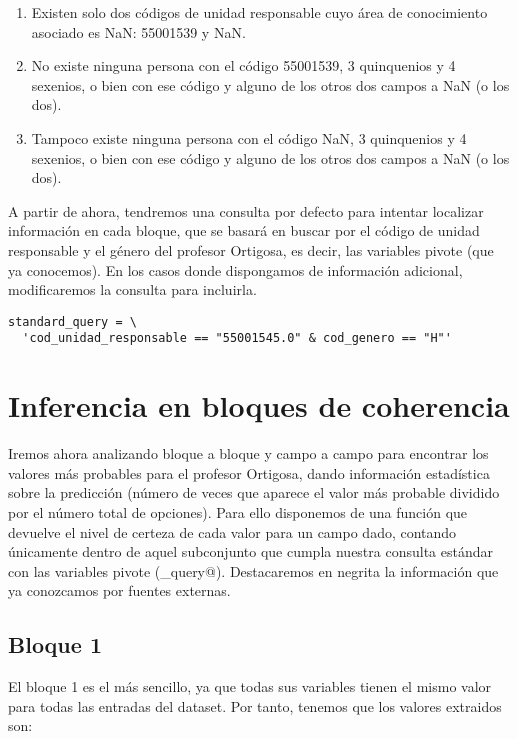 \documentclass[11pt]{article}
\begin{document}
\begin{enumerate}
  \item Existen solo dos códigos de unidad responsable cuyo área de conocimiento asociado es NaN: 55001539 y NaN.
  \item No existe ninguna persona con el código 55001539, 3 quinquenios y 4 sexenios, o bien con ese código y alguno de los otros dos campos a NaN (o los dos).
  \item Tampoco existe ninguna persona con el código NaN, 3 quinquenios y 4 sexenios, o bien con ese código y alguno de los otros dos campos a NaN (o los dos).
\end{enumerate}

A partir de ahora, tendremos una consulta por defecto para intentar localizar información en cada bloque, que se basará en buscar por el código de unidad responsable y el género del profesor Ortigosa, es decir, las variables pivote (que ya conocemos). En los casos donde dispongamos de información adicional, modificaremos la consulta para incluirla.

\begin{verbatim}
standard_query = \
  'cod_unidad_responsable == "55001545.0" & cod_genero == "H"'
\end{verbatim}

\section{Inferencia en bloques de coherencia}

Iremos ahora analizando bloque a bloque y campo a campo para encontrar los valores más probables para el profesor Ortigosa, dando información estadística sobre la predicción (número de veces que aparece el valor más probable dividido por el número total de opciones). Para ello disponemos de una función \verb@freq@ que devuelve el nivel de certeza de cada valor para un campo dado, contando únicamente dentro de aquel subconjunto que cumpla nuestra consulta estándar con las variables pivote (\verb@standard_query@). Destacaremos en negrita la información que ya conozcamos por fuentes externas.

\subsection{Bloque 1}
El bloque 1 es el más sencillo, ya que todas sus variables tienen el mismo valor para todas las entradas del dataset. Por tanto, tenemos que los valores extraidos son:
\end{document}
